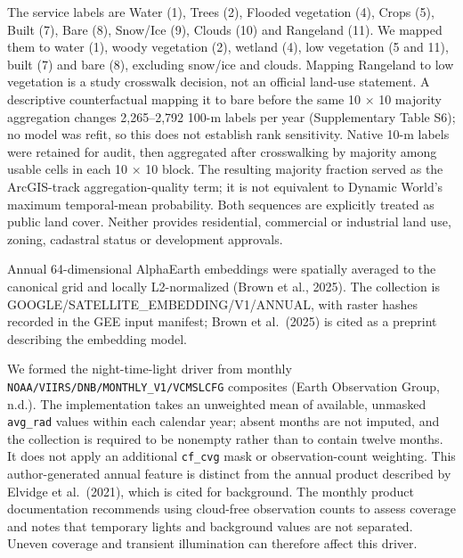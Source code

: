 The service labels are Water (1), Trees (2), Flooded vegetation (4),
Crops (5), Built (7), Bare (8), Snow/Ice (9), Clouds (10) and Rangeland
(11). We mapped them to water (1), woody vegetation (2), wetland (4),
low vegetation (5 and 11), built (7) and bare (8), excluding snow/ice
and clouds. Mapping Rangeland to low vegetation is a study crosswalk
decision, not an official land-use statement. A descriptive
counterfactual mapping it to bare before the same 10 × 10 majority
aggregation changes 2,265--2,792 100-m labels per year (Supplementary
Table S6); no model was refit, so this does not establish rank
sensitivity. Native 10-m labels were retained for audit, then aggregated
after crosswalking by majority among usable cells in each 10 × 10 block.
The resulting majority fraction served as the ArcGIS-track
aggregation-quality term; it is not equivalent to Dynamic World's
maximum temporal-mean probability. Both sequences are explicitly treated
as public land cover. Neither provides residential, commercial or
industrial land use, zoning, cadastral status or development approvals.

Annual 64-dimensional AlphaEarth embeddings were spatially averaged to
the canonical grid and locally L2-normalized (Brown et al., 2025). The
collection is GOOGLE/SATELLITE\_EMBEDDING/V1/ANNUAL, with raster hashes
recorded in the GEE input manifest; Brown et al.~(2025) is cited as a
preprint describing the embedding model.

We formed the night-time-light driver from monthly
\texttt{NOAA/VIIRS/DNB/MONTHLY\_V1/VCMSLCFG} composites (Earth
Observation Group, n.d.). The implementation takes an unweighted mean of
available, unmasked \texttt{avg\_rad} values within each calendar year;
absent months are not imputed, and the collection is required to be
nonempty rather than to contain twelve months. It does not apply an
additional \texttt{cf\_cvg} mask or observation-count weighting. This
author-generated annual feature is distinct from the annual product
described by Elvidge et al.~(2021), which is cited for background. The
monthly product documentation recommends using cloud-free observation
counts to assess coverage and notes that temporary lights and background
values are not separated. Uneven coverage and transient illumination can
therefore affect this driver.

